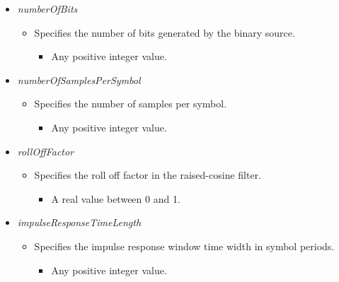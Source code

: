 \begin{refsection}
\begin{itemize}
   \item  \emph{numberOfBits}
   \begin{itemize}
     \item  Specifies the number of bits generated by the binary source.
     \begin{itemize}
       \item Any positive integer value.
     \end{itemize}
   \end{itemize}

     \item  \emph{numberOfSamplesPerSymbol}
   \begin{itemize}
     \item  Specifies the number of samples per symbol.
     \begin{itemize}
       \item Any positive integer value.
     \end{itemize}
   \end{itemize}

   \item  \emph{rollOffFactor}
   \begin{itemize}
     \item  Specifies the roll off factor in the raised-cosine filter.
     \begin{itemize}
       \item A real value between 0 and 1.
     \end{itemize}
   \end{itemize}

      \item  \emph{impulseResponseTimeLength}
   \begin{itemize}
     \item  Specifies the impulse response window time width in symbol periods.
     \begin{itemize}
       \item Any positive integer value.
     \end{itemize}
   \end{itemize}

 \end{itemize}


\clearpage
\printbibliography[heading=subbibliography]
\end{refsection}
\cleardoublepage

